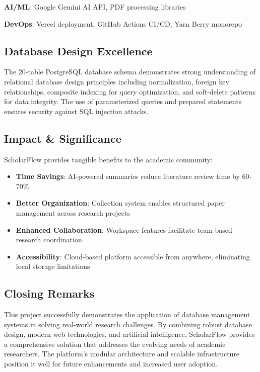 \textbf{AI/ML}: Google Gemini AI API, PDF processing libraries

\textbf{DevOps}: Vercel deployment, GitHub Actions CI/CD, Yarn Berry monorepo

\subsection{Database Design Excellence}

The 20-table PostgreSQL database schema demonstrates strong understanding of relational database design principles including normalization, foreign key relationships, composite indexing for query optimization, and soft-delete patterns for data integrity. The use of parameterized queries and prepared statements ensures security against SQL injection attacks.

\subsection{Impact \& Significance}

ScholarFlow provides tangible benefits to the academic community:

\begin{itemize}[leftmargin=*,topsep=3pt,itemsep=2pt]
    \item \textbf{Time Savings}: AI-powered summaries reduce literature review time by 60-70\%
    \item \textbf{Better Organization}: Collection system enables structured paper management across research projects
    \item \textbf{Enhanced Collaboration}: Workspace features facilitate team-based research coordination
    \item \textbf{Accessibility}: Cloud-based platform accessible from anywhere, eliminating local storage limitations
\end{itemize}

\subsection{Closing Remarks}

This project successfully demonstrates the application of database management systems in solving real-world research challenges. By combining robust database design, modern web technologies, and artificial intelligence, ScholarFlow provides a comprehensive solution that addresses the evolving needs of academic researchers. The platform's modular architecture and scalable infrastructure position it well for future enhancements and increased user adoption.
